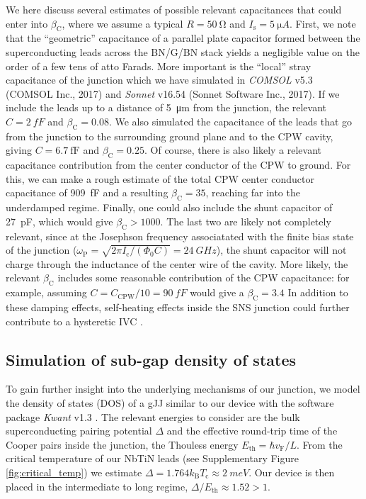We here discuss several estimates of possible relevant capacitances that could enter into $\beta_\text{C}$, where we assume a typical $R=\SI{50}{\ohm}$ and $I_\text{s}=\SI{5}{\micro A}$.
First, we note that the ``geometric'' capacitance of a parallel plate capacitor formed between the superconducting leads across the BN/G/BN stack yields a negligible value on the order of a few tens of atto Farads.
More important is the ``local'' stray capacitance of the junction which we have simulated in \textit{COMSOL} v5.3 (COMSOL Inc., 2017) and \textit{Sonnet} v16.54 (Sonnet Software Inc., 2017).
If we include the leads up to a distance of \SI{5}{\micro m} from the junction, the relevant $C=\SI{2}{fF}$ and $\beta_\text{C}=0.08$.
We also simulated the capacitance of the leads that go from the junction to the surrounding ground plane and to the CPW cavity, giving $C=\SI{6.7}{\femto\farad}$ and $\beta_\text{C}=0.25$.
Of course, there is also likely a relevant capacitance contribution from the center conductor of the CPW to ground.
For this, we can make a rough estimate of the total CPW center conductor capacitance of \SI{909}{fF} and a resulting $\beta_\text{C}=35$, reaching far into the underdamped regime.
Finally, one could also include the shunt capacitor of \SI{27}{pF}, which would give $\beta_\text{C}>1000$. 
The last two are likely not completely relevant, since at the Josephson frequency associatated with the finite bias state of the junction ($\omega_\text{P}=\sqrt{2\pi I_\text{c}/(\Phi_0 C)}=\SI{24}{GHz}$), the shunt capacitor will not charge through the inductance of the center wire of the cavity. 
More likely, the relevant $\beta_\text{C}$ includes some reasonable contribution of the CPW capacitance: for example, assuming $C = C_\text{CPW} / 10 = \SI{90}{fF}$ would give a $\beta_\text{C} = 3.4$
In addition to these damping effects, self-heating effects inside the SNS junction could further contribute to a hysteretic IVC \cite{courtoisOriginHysteresisProximity2008a,borzenetsPhononBottleneckGraphenebased2013}.




\subsection{Simulation of sub-gap density of states}\label{sec:subgap}
\noindent To gain further insight into the underlying mechanisms of our junction, we model the density of states (DOS) of a gJJ similar to our device with the software package \textit{Kwant} v1.3 \cite{grothKwantSoftwarePackage2014}.
The relevant energies to consider are the bulk superconducting pairing potential $\Delta$ and the effective round-trip time of the Cooper pairs inside the junction, the Thouless energy $E_\text{th}=\hbar v_\text{F}/L$.
From the critical temperature of our NbTiN leads (see Supplementary Figure \ref{fig:critical_temp}) we estimate\cite{tinkhamIntroductionSuperconductivity1996} $\Delta=1.764k_\text{B} T_\text{c}\approx\SI{2}{meV}$.
Our device is then placed in the intermediate to long regime, $\Delta/E_\text{th}\approx1.52>1$.

